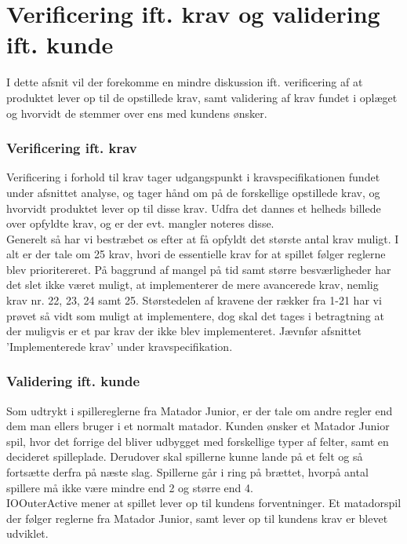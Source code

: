 \section{Verificering ift. krav og validering ift. kunde}
I dette afsnit vil der forekomme en mindre diskussion ift. verificering af at produktet lever op til de opstillede krav, samt validering af krav fundet i oplæget og hvorvidt de stemmer over ens med kundens ønsker.\\

\subsubsection{Verificering ift. krav}
Verificering i forhold til krav tager udgangspunkt i kravspecifikationen fundet under afsnittet analyse, og tager hånd om på de forskellige opstillede krav, og hvorvidt produktet lever op til disse krav. Udfra det dannes et helheds billede over opfyldte krav, og er der evt. mangler noteres disse.\\
Generelt så har vi bestræbet os efter at få opfyldt det største antal krav muligt. I alt er der tale om 25 krav, hvori de essentielle krav for at spillet følger reglerne blev prioritereret. På baggrund af mangel på tid samt større besværligheder har det slet ikke været muligt, at implementerer de mere avancerede krav, nemlig krav nr. 22, 23, 24 samt 25. Størstedelen af kravene der rækker fra 1-21 har vi prøvet så vidt som muligt at implementere, dog skal det tages i betragtning at der muligvis er et par krav der ikke blev implementeret. Jævnfør afsnittet 'Implementerede krav' under kravspecifikation.\\

\subsubsection{Validering ift. kunde}
Som udtrykt i spillereglerne fra Matador Junior, er der tale om andre regler end dem man ellers bruger i et normalt matador. Kunden ønsker et Matador Junior spil, hvor det forrige del bliver udbygget med forskellige typer af felter, samt en decideret spilleplade. Derudover skal spillerne kunne lande på et felt og så fortsætte derfra på næste slag. Spillerne går i ring på brættet, hvorpå antal spillere må ikke være mindre end 2 og større end 4.
\\
IOOuterActive mener at spillet lever op til kundens forventninger. Et matadorspil der følger reglerne fra Matador Junior, samt lever op til kundens krav er blevet udviklet.\\

\pagebreak